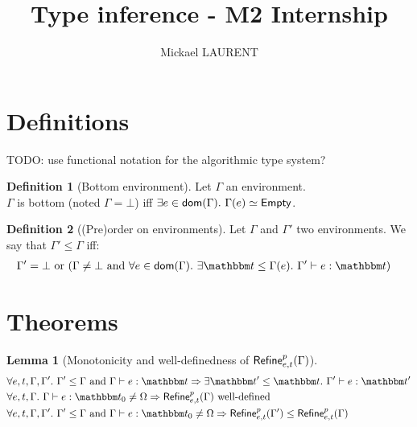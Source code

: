 \documentclass[a4paper]{article}
\title{\vspace{1.5cm}Type inference - M2 Internship}
\author{Mickael LAURENT}
\date{\vspace{-5ex}}
\theoremstyle{definition}
\newtheorem{lemma}{Lemma}
\newtheorem{definition}{Definition}
\begin{document}
  \maketitle

  \section{Definitions}

  TODO: use functional notation for the algorithmic type system?

    \begin{definition}[Bottom environment]
      Let $\Gamma$ an environment.\\
      $\Gamma$ is bottom (noted $\Gamma = \bot$) iff $\exists e\in\dom\Gamma.\ \Gamma(e)\simeq\Empty$.
    \end{definition}

    \begin{definition}[(Pre)order on environments]
    Let $\Gamma$ and $\Gamma'$ two environments. We say that $\Gamma' \leq \Gamma$ iff:
    \begin{align*}
        &\Gamma'=\bot \text{ or } (\Gamma\neq\bot \text{ and } \forall e \in \dom \Gamma.\ \exists \ts\leq \Gamma(e).\ \Gamma' \vdash e : \ts)
    \end{align*}
    \end{definition}

  \section{Theorems}

  \begin{lemma}[Monotonicity and well-definedness of $\textsf{Refine}^{p}_{e,t}(\Gamma)$]
    \begin{align*}
      &\forall e,t,\Gamma,\Gamma'.\ \Gamma'\leq\Gamma \text{ and } \Gamma \vdash e:\ts \Rightarrow \exists \ts'\leq \ts.\ \Gamma' \vdash e:\ts'\\
      &\forall e,t,\Gamma.\ \Gamma \vdash e:\ts_0 \neq \tsempty \Rightarrow \Refine p {e,t} \Gamma \text{ well-defined}\\
      &\forall e,t,\Gamma,\Gamma'.\ \Gamma'\leq\Gamma \text{ and } \Gamma \vdash e:\ts_0 \neq \tsempty \Rightarrow \Refine p {e,t} {\Gamma'} \leq \Refine p {e,t} \Gamma\\
    \end{align*}
  \end{lemma}
\end{document}
